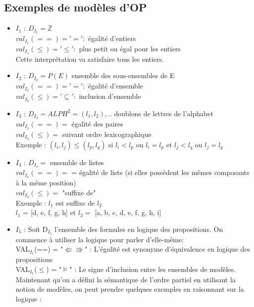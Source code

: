 \subsection{Exemples de modèles d'OP}
\begin{itemize}
\item \underline{$I_{1}$} : $D_{I_{1}} =  \mathbb{Z}$ \\
$ val_{I_{1}}(==) = '=' :$ égalité d'entiers \\
$ val_{I_{1}}(\leq) = '\leq' :$ plus petit ou égal pour les entiers\\
Cette interprétation va satisfaire tous les entiers.
\item \underline{$I_{2}$} : $D_{I_{2}} =  P(E)$ ensemble des sous-ensembles de E\\
$ val_{I_{2}}(==) = '=' :$ égalité d'ensemble \\
$ val_{I_{2}}(\leq) = '\subseteq' :$ inclusion d'ensemble
\item \underline{$I_{3}$} : $D_{I_{3}} = ALPH^{2} = {(l_{1},l_{2}),..}$ doublons de lettres de l'alphabet\\
$ val_{I_{3}}(==) = $ égalité des paires \\
$ val_{I_{3}}(\leq) =$ suivant ordre lexicographique\\
Exemple : $(l_{i},l_{j}) \leq (l_{p},l_{q})$ si $ l_{i} < l_{p}$ ou $ l_{i} = l_{p}$ et $ l_{j} < l_{q}$ ou $ l_{j} = l_{q}$
\item \underline{$I_{3}$} : $D_{I_{4}} =$ ensemble de listes\\
$ val_{I_{4}}(==) = $ = égalité de liste (si elles possèdent les mêmes composants à la même position)\\
$ val_{I_{3}}(\leq) =$ "suffixe de" \\
Exemple : $l_{1} $ est suffixe de $l_{2}$ \\
$l_{1} $ = [d, e, f, g, h] et $l_{2} =$ [a, b, c, d, e, f, g, h, i]
\item \underline{$I_{5}$} : Soit D$_{I_{5}}$ l'ensemble des formules en logique des propositions. On commence à utiliser la logique pour parler d'elle-même:\\
VAL$_{I_{5}}$(==) = "$\Lleftarrow \Rrightarrow$" : L'égalité est synonyme d'équivalence en logique des propositions \\
VAL$_{I_{5}}$($\leq$) = "$\models$" : Le signe d'inclusion entre les ensembles de modèles.
Maintenant qu'on a défini la sémantique de l'ordre partiel en utilisant la notion de modèles, on peut prendre quelques exemples en raisonnant sur la logique :\\

\end{itemize}
